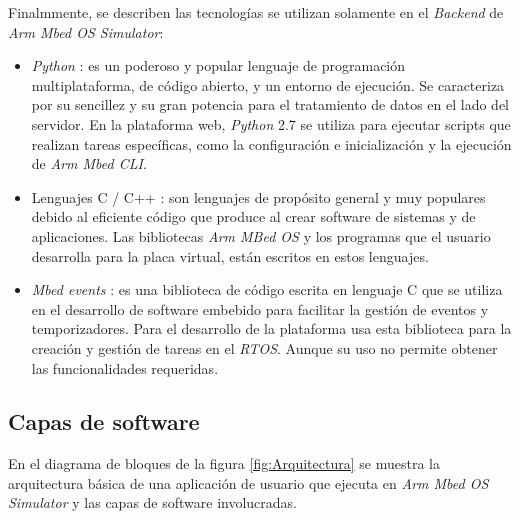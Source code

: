 Finalmmente, se describen las tecnologías se utilizan solamente en el \textit{Backend} de \textit{Arm Mbed OS Simulator}:

\begin{itemize}

    \item \textit{Python} \citep{Python}: es un poderoso y popular lenguaje de programación multiplataforma, de código abierto, y un entorno de ejecución. Se caracteriza por su sencillez y su gran potencia para el tratamiento de datos en el lado del servidor. En la plataforma web, \textit{Python} 2.7 se utiliza para ejecutar scripts que realizan tareas específicas, como la configuración e inicialización y la ejecución de \textit{Arm Mbed CLI}.

    \item Lenguajes C / C++ \citep{LenguajeC}: son lenguajes de propósito general y muy populares debido al eficiente código que produce al crear software de sistemas y de aplicaciones.  Las bibliotecas \textit{Arm MBed OS} y los programas que el usuario desarrolla para la placa virtual, están escritos en estos lenguajes.

    \item \textit{Mbed events} \citep{ArmMbedEvents}: es una biblioteca de código escrita en lenguaje C que se utiliza en el desarrollo de software embebido para facilitar la gestión de eventos y temporizadores. Para el desarrollo de la plataforma usa esta biblioteca para la creación y gestión de tareas en el \textit{RTOS}. Aunque su uso no permite obtener las funcionalidades requeridas.
    
\end{itemize}

\subsection{Capas de software}

En el diagrama de bloques de la figura \ref{fig:Arquitectura} se muestra la arquitectura básica de una aplicación de usuario que ejecuta en \textit{Arm Mbed OS Simulator} y las capas de software involucradas.

